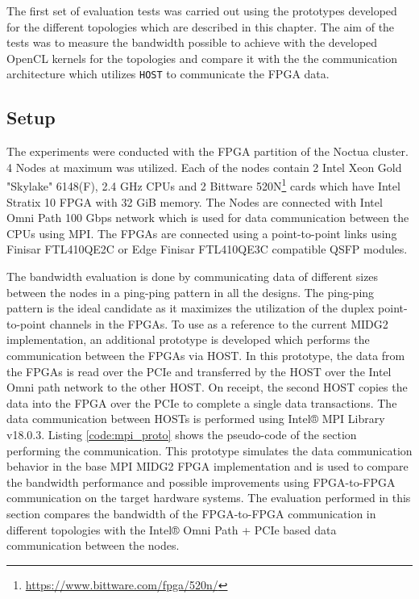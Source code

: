 The first set of evaluation tests was carried out using the prototypes
developed for the different topologies which are described in this chapter.
The aim of the tests was to measure the bandwidth possible to achieve with the
developed OpenCL kernels for the topologies and compare it with the
the communication architecture which utilizes \texttt{HOST} to communicate the
FPGA data.

\subsection{Setup}

The experiments were conducted with the FPGA partition of the Noctua
cluster. 4 Nodes at maximum was utilized. Each of the nodes
contain 2 Intel Xeon Gold "Skylake" 6148(F), 2.4 GHz CPUs and
2 Bittware 520N\footnote{\url{https://www.bittware.com/fpga/520n/}}
cards which have Intel Stratix 10 FPGA with 32 GiB memory. The Nodes
are connected with Intel Omni Path 100 Gbps network which is used
for data communication between the CPUs using MPI. The FPGAs
are connected using a point-to-point links using Finisar FTL410QE2C
or Edge Finisar FTL410QE3C compatible QSFP modules.

The bandwidth evaluation is done by communicating data of different
sizes between the nodes in a ping-ping pattern in all the designs.
The ping-ping pattern is the ideal candidate as it maximizes
the utilization of the duplex point-to-point channels in the
FPGAs. To use as a reference to the current MIDG2 implementation,
an additional prototype is developed which performs the communication
between the FPGAs via HOST. In this prototype, the data from the FPGAs
is read over the PCIe and transferred by the HOST over the Intel
Omni path network to the other HOST. On receipt, the second HOST
copies the data into the FPGA over the PCIe to complete a single data
transactions. The data communication between HOSTs is performed using
Intel® MPI Library v18.0.3. Listing \ref{code:mpi_proto} shows the pseudo-code of the section
performing the communication. This prototype simulates the data communication
behavior in the base MPI MIDG2 FPGA implementation and is used to compare the
bandwidth performance and possible improvements using FPGA-to-FPGA communication
on the target hardware systems. The evaluation performed in this
section compares the bandwidth of the FPGA-to-FPGA communication
in  different topologies with the Intel® Omni Path + PCIe based
data communication between the nodes.

